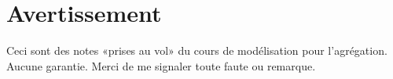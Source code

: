 \section{Avertissement}

Ceci sont des notes «prises au vol» du cours de modélisation pour l'agrégation. Aucune garantie. Merci de me signaler toute faute ou remarque.
